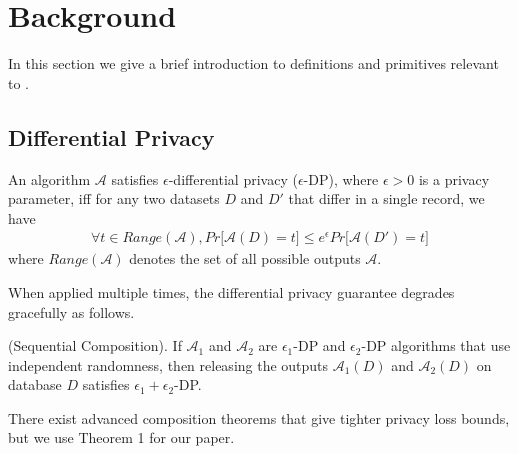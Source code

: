 
\section{Background}
In this section we give a brief introduction to definitions and primitives relevant to \system. 

\subsection{Differential Privacy}
\begin{definition} An algorithm $\mathcal{A}$
satisfies $\epsilon$-differential privacy ($\epsilon$-DP), where $\epsilon > 0$ is a privacy parameter, iff
 for any two datasets $D$ and $D'$ that differ in a single record, we have
\begin{gather}
\forall t \in Range(\mathcal{A}), Pr \big[\mathcal{A}(D) = t\big] \leq e^{\epsilon}Pr\big[\mathcal{A}(D') = t\big]
\end{gather}
where $Range(\mathcal{A})$ denotes the set of all possible outputs
$\mathcal{A}$.
\end{definition} 
When applied multiple times, the differential privacy guarantee degrades gracefully as follows.
\begin{theorem}(Sequential Composition). If $\mathcal{A}_1$ and
$\mathcal{A}_2$ are $\epsilon_1$-DP and $\epsilon_2$-DP algorithms that use independent randomness, then releasing the outputs $\mathcal{A}_1(D)$ and
$\mathcal{A}_2(D)$ on database $D$ satisfies $\epsilon_1+\epsilon_2$-DP.\end{theorem} 
There exist advanced composition theorems that give tighter privacy loss
bounds, but we
use Theorem 1 for our paper.

